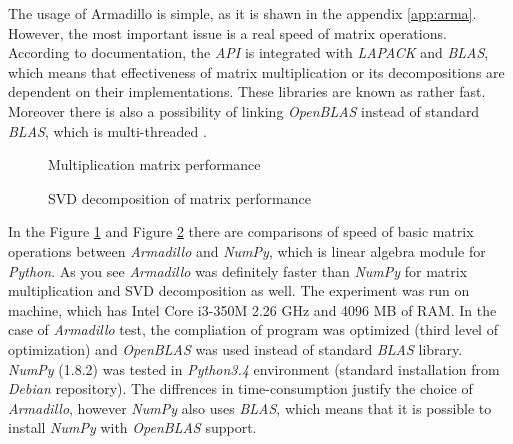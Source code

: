 The usage of Armadillo is simple, as it is shawn in the appendix \ref{app:arma}. However, the most important issue is a real speed of matrix operations. According to documentation, the \textit{API} is integrated with \textit{LAPACK} and \textit{BLAS}, which means that effectiveness of matrix multiplication or its decompositions are dependent on their implementations. These libraries are known as rather fast. Moreover there is also a possibility of linking \textit{OpenBLAS} instead of standard \textit{BLAS}, which is multi-threaded \cite{Arma}. 

\begin{figure}[h]
\centering
\label{fig:mulperf}
\caption{Multiplication matrix performance}
\end{figure}

\begin{figure}
\centering
\label{fig:svdperf}
\caption{SVD decomposition of matrix performance}
\end{figure}


In the Figure \ref{fig:mulperf} and Figure \ref{fig:svdperf}  there are comparisons of speed of basic matrix operations between \textit{Armadillo} and \textit{NumPy}, which is linear algebra module for \textit{Python}. As you see \textit{Armadillo} was definitely faster than \textit{NumPy} for matrix multiplication and SVD decomposition as well.   
The experiment was run on machine, which has Intel Core i3-350M 2.26 GHz and 4096 MB of RAM. In the case of \textit{Armadillo} test, the compliation of program was optimized (third level of optimization) and \textit{OpenBLAS} was used instead of standard \textit{BLAS} library. \textit{NumPy} (1.8.2) was tested in \textit{Python3.4} environment (standard installation from \textit{Debian} repository). The diffrences in time-consumption justify the choice of \textit{Armadillo}, however \textit{NumPy} also uses \textit{BLAS}, which means that it is possible to install \textit{NumPy} with \textit{OpenBLAS} support.

